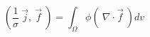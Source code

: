 \begin{equation}
\left( \frac{1}{\sigma}~\vec{j}, ~\vec{f}~ \right) =
\int_\Omega \phi \left(~\nabla \cdot \vec{f} ~ \right) dv
\end{equation}
